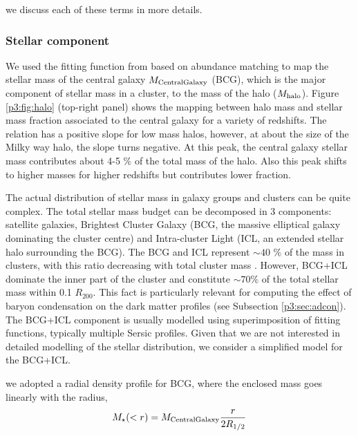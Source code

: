 \documentclass[
  11pt,
  twoside,
  openright,
  titlepage,
  headings=optiontoheadandtoc
]{scrbook}
\begin{document}
we discuss each of these terms in more details.


\subsubsection{Stellar component}\label{p3:sec:stellar}
We used the fitting function from \cite{2013MNRAS.428.3121M} based on abundance matching to map the stellar mass of the central galaxy $M_{\rm CentralGalaxy}$ (BCG), which is the major component of stellar mass in a cluster, to the mass of the halo ($M_{\rm{halo}}$). Figure \ref{p3:fig:halo} (top-right panel) shows the mapping between halo mass and stellar mass fraction associated to the central galaxy for a variety of redshifts. The relation has a positive slope for low mass halos, however, at about the size of the Milky way halo, the slope turns negative. At this peak, the central galaxy stellar mass contributes about 4-5 $\%$ of the total mass of the halo. Also this peak shifts to higher masses for higher redshifts but contributes lower fraction. 

The actual distribution of stellar mass in galaxy groups and clusters can be quite complex. The total stellar mass budget can be decomposed in 3 components: satellite galaxies, Brightest Cluster Galaxy (BCG, the massive elliptical galaxy dominating the cluster centre) and Intra-cluster Light (ICL, an extended stellar halo surrounding the BCG). The BCG and ICL represent $\sim 40$ \% of the mass in clusters, with this ratio decreasing with total cluster mass \citep{2007ApJ...666..147G}. However, BCG+ICL dominate the inner part of the cluster and constitute $\sim 70\%$ of the total stellar mass within 0.1 $R_{200}$. This fact is particularly relevant for computing the effect of baryon condensation on the dark matter profiles (see Subsection \ref{p3:sec:adcon}). The BCG+ICL component is usually modelled using superimposition of fitting functions, typically multiple Sersic profiles. Given that we are not interested in detailed modelling of the stellar distribution, we consider a simplified model for the BCG+ICL. 


we adopted a radial density profile for BCG, where the enclosed mass  goes linearly with the radius, 
\begin{equation}
	M_{\star}(<r) = M_{\rm CentralGalaxy} \dfrac{r}{2R_{1/2}}
\end{equation}
\end{document}
